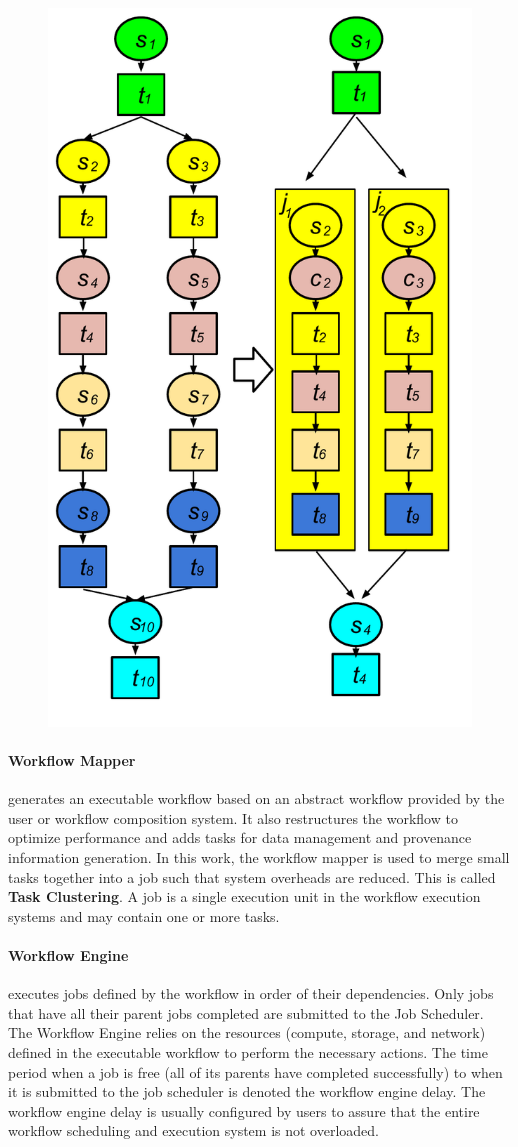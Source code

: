 \begin{figure}[!htb]
\centering
 \includegraphics[width=0.65\linewidth]{figures/model/vc_color.pdf}
  \label{fig:model_vc}
  \vspace{-15pt}
\end{figure}

\paragraph{Workflow Mapper} generates an executable workflow based on an abstract workflow provided by the user or workflow composition system. It also restructures the workflow to optimize performance and adds tasks for data management and provenance information generation. In this work, the workflow mapper is used to merge small tasks together into a job such that system overheads are reduced. This is called \textbf{Task Clustering}. A job is a single execution unit in the workflow execution systems and may contain one or more tasks. 


\paragraph{Workflow Engine} executes jobs defined by the workflow in order of their dependencies. Only jobs that have all their parent jobs completed are submitted to the Job Scheduler. The Workflow Engine relies on the resources (compute, storage, and network) defined in the executable workflow to perform the necessary actions. The time period when a job is free (all of its parents have completed successfully) to when it is submitted to the job scheduler is denoted the workflow engine delay. The workflow engine delay is usually configured by users to assure that the entire workflow scheduling and execution system is not overloaded. 

